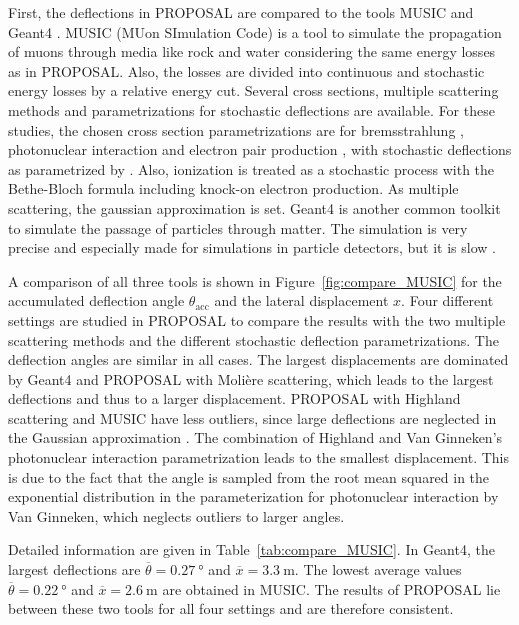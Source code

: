 \documentclass[pdflatex, sn-mathphys]{sn-jnl}%
\theoremstyle{thmstyleone}%
\theoremstyle{thmstyletwo}%
\theoremstyle{thmstylethree}%
\begin{document}
First, the deflections in PROPOSAL are compared to 
the tools MUSIC \cite{MUSIC,comparison_MUSIC_GEANT4_2009} and Geant4 \cite{GEANT4}.
MUSIC (MUon SImulation Code) is a tool to simulate the propagation of muons 
through media like rock and water considering the same energy losses as in 
PROPOSAL. Also, the losses are divided into continuous and stochastic 
energy losses by a relative energy cut. Several cross sections, multiple scattering 
methods and parametrizations for stochastic deflections are 
available. For these studies, the chosen cross section parametrizations are for bremsstrahlung \cite{Bremsstrahlung_KKP}, 
photonuclear interaction \cite{nulcint_bugaev_Shlepin, bugaev_1980_defl,bugaev_1981_defl} 
and electron pair production \cite{epair_kelner,epair_kokoulin_petrukhin}, 
with stochastic deflections as parametrized by \cite{Van_Ginneken}. 
Also, ionization is treated as a stochastic process with the Bethe-Bloch 
formula including knock-on electron production. As multiple scattering, the gaussian 
approximation \cite{HIGHLAND_1975} is set. 
Geant4 is another common toolkit to simulate the passage of particles through 
matter. The simulation is very precise and especially 
made for simulations in particle detectors, but it is slow \cite{GEANT4}. 

A comparison of all three tools is shown in Figure~\ref{fig:compare_MUSIC} 
for the 
accumulated deflection angle $\theta_{\text{acc}}$ and the lateral displacement
$x$. Four different settings are studied in PROPOSAL to compare the results with 
the two multiple scattering methods and the different stochastic deflection parametrizations.
The deflection angles are 
similar in all cases. The 
largest displacements are dominated by Geant4 and PROPOSAL with Molière scattering, which 
leads to the largest deflections and thus to a larger displacement. 
PROPOSAL with Highland scattering and MUSIC have less outliers, since large 
deflections are neglected in the Gaussian approximation \cite{HIGHLAND_1975}. 
The combination of Highland and 
Van Ginneken's photonuclear interaction parametrization leads to the smallest 
displacement. This is due to the fact that the angle is sampled from the root mean squared in the exponential distribution
in the parameterization for photonuclear interaction by Van Ginneken, which neglects 
outliers to larger angles.

Detailed information are given in Table~\ref{tab:compare_MUSIC}. In Geant4, the 
largest deflections are $\overline{\theta} = \SI{0.27}{\degree}$ 
and $\overline{x} = \SI{3.3}{\meter}$. The lowest average values $\overline{\theta} = \SI{0.22}{\degree}$ and 
$\overline{x} = \SI{2.6}{\meter}$ are obtained in MUSIC. The results of PROPOSAL lie between 
these two tools for all four settings and are therefore consistent. 
\end{document}
